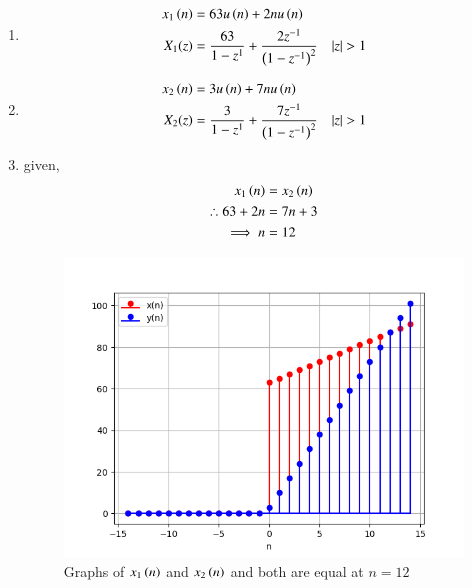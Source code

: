 \documentclass[journal,12pt,twocolumn]{IEEEtran}
\theoremstyle{remark}
\begin{document}
\begin{enumerate}
\item
\begin{align}
x_1\brak{n} &= 63u\brak{n} + 2nu\brak{n} \label{eq:3}\\
X_1(z) &= \frac{63}{1-z^{1}} + \frac{2z^{-1}}{\brak{1-z^{-1}}^{2}}  \quad |z|>1
\end{align}
\item
\begin{align}
x_2\brak{n} &= 3u\brak{n} + 7nu\brak{n} \label{eq:4}\\ 
X_2(z) &= \frac{3}{1-z^{1}} + \frac{7z^{-1}}{\brak{1-z^{-1}}^{2}} \quad |z|>1
\end{align}
\item

given,
\begin{align}
 x_1\left(n\right) &= x_2\left(n\right)\\
\therefore 63 + 2n &= 7n+3\\
\implies n &= 12
\end{align}
\begin{figure}[h!]
    \includegraphics[width = \columnwidth]{Figure_1.png}
    \caption{Graphs of $ x_1\left(n\right)$ and $ x_2\left(n\right)$ and both are equal at $ n=12$}
    \label{fig: 1}
\end{figure}
\end{enumerate}
\end{document}
